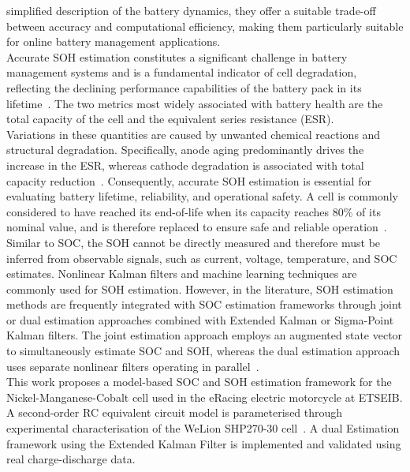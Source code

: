 simplified description of the battery dynamics, they offer a suitable trade-off between accuracy and computational efficiency, 
making them particularly suitable for online battery management applications.
\\
Accurate \acs{SOH} estimation constitutes a significant challenge in battery management systems and is a fundamental 
indicator of cell degradation, reflecting the declining performance capabilities of the 
battery pack in its lifetime~\cite{plett2015battery}. 
The two metrics most widely associated with battery health are the total capacity of the cell and the equivalent 
series resistance (\acs{ESR}).
\\
Variations in these quantities are caused by unwanted chemical reactions and structural degradation.
Specifically, anode aging predominantly drives the increase in the \acs{ESR}, whereas cathode degradation is associated with total capacity 
reduction~\cite{plett2015battery}. Consequently, accurate \acs{SOH} estimation is essential for evaluating battery lifetime, reliability,
and operational safety. A cell is commonly considered to have reached its end-of-life when its capacity reaches $80\%$ 
of its nominal value, and is therefore replaced to ensure safe and reliable operation~\cite{SOHBook}.
\\
Similar to \acs{SOC}, the \acs{SOH} cannot be directly measured and therefore must be inferred from observable signals, such as current, voltage,
temperature, and \acs{SOC} estimates. Nonlinear Kalman filters and machine learning techniques are commonly used for \acs{SOH} estimation. 
However, in the literature, \acs{SOH} estimation methods are frequently integrated with \acs{SOC} estimation frameworks 
through joint or dual estimation approaches combined with Extended Kalman or Sigma-Point Kalman filters. 
The joint estimation approach employs an augmented state vector to simultaneously estimate \acs{SOC} and \acs{SOH}, 
whereas the dual estimation approach uses separate nonlinear filters operating in parallel~\cite{plett2015battery}.
\\
This work proposes a model-based \acs{SOC} and \acs{SOH} estimation framework for the Nickel-Manganese-Cobalt cell used in the eRacing 
electric motorcycle at ETSEIB. A second-order RC equivalent circuit model is parameterised through experimental 
characterisation of the WeLion SHP270-30 cell~\cite{welion2026shp270}. A dual Estimation framework using
the Extended Kalman Filter is implemented and validated using real charge-discharge data.

